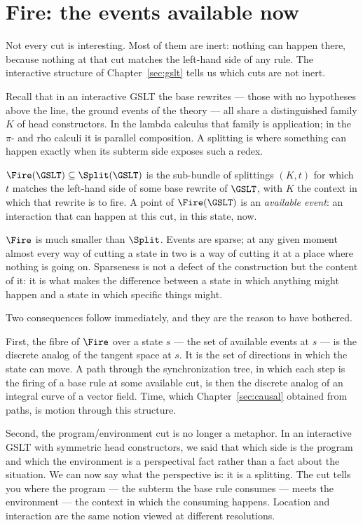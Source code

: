 \section{Fire: the events available now}

Not every cut is interesting.
Most of them are inert: nothing can happen there, because nothing
at that cut matches the left-hand side of any rule.
The interactive structure of Chapter~\ref{sec:gslt} tells us which
cuts are not inert.

Recall that in an interactive GSLT the base rewrites --- those
with no hypotheses above the line, the ground events of the
theory --- all share a distinguished family $K$ of head
constructors.
In the lambda calculus that family is application; in the $\pi$-
and rho calculi it is parallel composition.
A splitting is where something can happen exactly when its
subterm side exposes such a redex.

\begin{definition}
\label{def:fire}
$\Fire(\GSLT) \subseteq \Split(\GSLT)$ is the sub-bundle of
splittings $(K,t)$ for which $t$ matches the left-hand side of
some base rewrite of $\GSLT$, with $K$ the context in which that
rewrite is to fire.
A point of $\Fire(\GSLT)$ is an \emph{available event}: an
interaction that can happen at this cut, in this state, now.
\end{definition}

$\Fire$ is much smaller than $\Split$.
Events are sparse; at any given moment almost every way of cutting
a state in two is a way of cutting it at a place where nothing is
going on.
Sparseness is not a defect of the construction but the content of
it: it is what makes the difference between a state in which
anything might happen and a state in which specific things might.

Two consequences follow immediately, and they are the reason to
have bothered.

First, the fibre of $\Fire$ over a state $s$ --- the set of
available events at $s$ --- is the discrete analog of the
tangent space at $s$.
It is the set of directions in which the state can move.
A path through the synchronization tree, in which each step is the
firing of a base rule at some available cut, is then the discrete
analog of an integral curve of a vector field.
Time, which Chapter~\ref{sec:causal} obtained from paths, is
motion through this structure.

Second, the program/environment cut is no longer a metaphor.
In an interactive GSLT with symmetric head constructors, we said
that which side is the program and which the environment is a
perspectival fact rather than a fact about the situation.
We can now say what the perspective is: it is a splitting.
The cut tells you where the program --- the subterm the base rule
consumes --- meets the environment --- the context in which the
consuming happens.
Location and interaction are the same notion viewed at different
resolutions.


